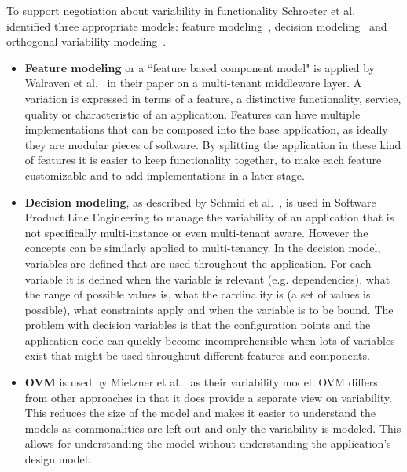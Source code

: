 To support negotiation about variability in functionality Schroeter et al.~\cite{schroeter2012towards} identified three appropriate models: feature modeling~\cite{benavides2010automated,kang1990feature}, decision modeling~\cite{schmid2004customizable,schmid2011comparison} and orthogonal variability modeling~\cite{lauenroth2005software,metzger2007disambiguating}.

\begin{itemize}
\item \textbf{Feature modeling} or a ``feature based component model" is applied by Walraven et al.~\cite{walraven2011middleware} in their paper on a multi-tenant middleware layer. A variation is
expressed in terms of a feature, a distinctive functionality, service, quality or characteristic of an 
application. Features can have multiple implementations that can be composed into the 
base application, as ideally they are modular pieces of software. By splitting the application in 
these kind of features it is easier to keep functionality together, to make each feature 
customizable and to add implementations in a later stage.

\item \textbf{Decision modeling}, as described by Schmid et al.~\cite{schmid2004customizable}, is used in 
Software Product Line Engineering to manage the variability of an application that is not specifically 
multi-instance or even multi-tenant aware. However the concepts can be similarly applied to 
multi-tenancy. In the decision model, variables are defined that are used throughout the 
application. For each variable it is defined when the variable is relevant (e.g. dependencies), 
what the range of possible values is, what the cardinality is (a set of values is possible), what 
constraints apply and when the variable is to be bound. The problem with decision variables is 
that the configuration points and the application code can quickly become incomprehensible 
when lots of variables exist that might be used throughout different features and components.

\item \textbf{\acf{OVM}} is used by Mietzner et al.~\cite{mietzner2009variability} as their variability model. \ac{OVM} differs from other approaches in that it does provide a separate view on variability. This reduces the size of the model and makes it easier to understand the models as commonalities are left out and only the variability is modeled. This allows for understanding the model without understanding the application's design model. 


\end{itemize}
